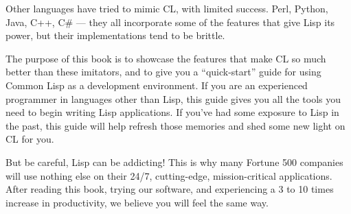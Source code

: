 \documentclass[11pt]{book}
\begin{document}
Other languages have tried to mimic CL, with limited success. Perl, Python, Java,
C++, C\# --- they all incorporate some of the features that give Lisp its power, but their
implementations tend to be brittle.

The purpose of this book is to showcase the features that make CL so much better
than these imitators, and to give you a ``quick-start'' guide for using Common Lisp as a
development environment. If you are an experienced programmer in languages other than
Lisp, this guide gives you all the tools you need to begin writing Lisp applications. If you've
had some exposure to Lisp in the past, this guide will help refresh those memories and shed
some new light on CL for you.

But be careful, Lisp can be addicting! This is why many Fortune 500 companies will
use nothing else on their 24/7, cutting-edge, mission-critical applications. After reading
this book, trying our software, and experiencing a 3 to 10 times increase in productivity,
we believe you will feel the same way.

\tableofcontents

\mainmatter











\backmatter

\appendix






\printindex
\end{document}

